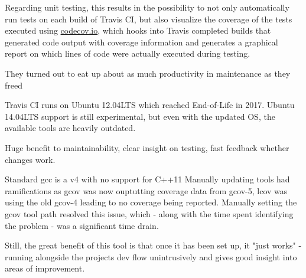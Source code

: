 Regarding unit testing, this results in the possibility to not only automatically run tests on each build of Travis CI, but also visualize the \gls{coverage} of the tests executed using \url{codecov.io}, which hooks into Travis completed builds that generated code output with coverage information and generates a graphical report on which lines of code were actually executed during testing.

They turned out to eat up about as much productivity in maintenance as they freed

Travis CI runs on Ubuntu 12.04LTS which reached End-of-Life in 2017. Ubuntu 14.04LTS support is still experimental, but even with the updated OS, the available tools are heavily outdated.

Huge benefit to maintainability, clear insight on testing, fast feedback whether changes work.

Standard gcc is a v4 with no support for C++11
Manually updating tools had ramifications as gcov was now ouptutting coverage data from gcov-5, lcov was using the old gcov-4 leading to no coverage being reported. Manually setting the gcov tool path resolved this issue, which - along with the time spent identifying the problem - was a significant time drain.

Still, the great benefit of this tool is that once it has been set up, it "just works" - running alongside the projects dev flow unintrusively and gives good insight into areas of improvement.

